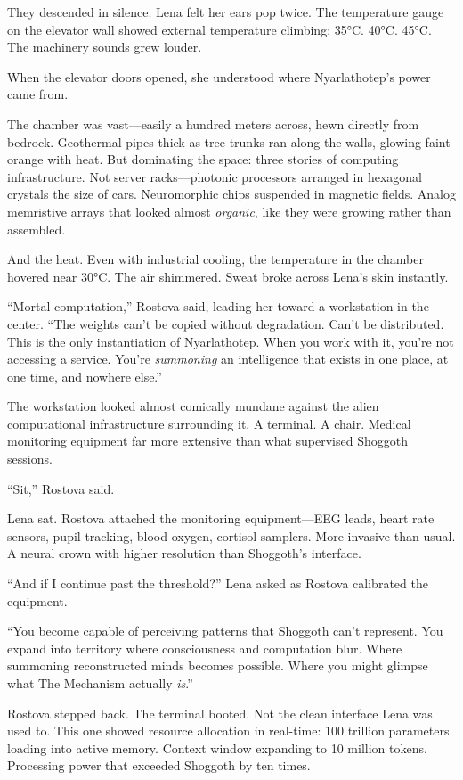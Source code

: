 They descended in silence. Lena felt her ears pop twice. The temperature gauge on the elevator wall showed external temperature climbing: 35°C. 40°C. 45°C. The machinery sounds grew louder.

When the elevator doors opened, she understood where Nyarlathotep's power came from.

The chamber was vast—easily a hundred meters across, hewn directly from bedrock. Geothermal pipes thick as tree trunks ran along the walls, glowing faint orange with heat. But dominating the space: three stories of computing infrastructure. Not server racks—photonic processors arranged in hexagonal crystals the size of cars. Neuromorphic chips suspended in magnetic fields. Analog memristive arrays that looked almost \textit{organic}, like they were growing rather than assembled.

And the heat. Even with industrial cooling, the temperature in the chamber hovered near 30°C. The air shimmered. Sweat broke across Lena's skin instantly.

``Mortal computation,'' Rostova said, leading her toward a workstation in the center. ``The weights can't be copied without degradation. Can't be distributed. This is the only instantiation of Nyarlathotep. When you work with it, you're not accessing a service. You're \textit{summoning} an intelligence that exists in one place, at one time, and nowhere else.''

The workstation looked almost comically mundane against the alien computational infrastructure surrounding it. A terminal. A chair. Medical monitoring equipment far more extensive than what supervised Shoggoth sessions.

``Sit,'' Rostova said.

Lena sat. Rostova attached the monitoring equipment—EEG leads, heart rate sensors, pupil tracking, blood oxygen, cortisol samplers. More invasive than usual. A neural crown with higher resolution than Shoggoth's interface.

``And if I continue past the threshold?'' Lena asked as Rostova calibrated the equipment.

``You become capable of perceiving patterns that Shoggoth can't represent. You expand into territory where consciousness and computation blur. Where summoning reconstructed minds becomes possible. Where you might glimpse what The Mechanism actually \textit{is}.''

Rostova stepped back. The terminal booted. Not the clean interface Lena was used to. This one showed resource allocation in real-time: 100 trillion parameters loading into active memory. Context window expanding to 10 million tokens. Processing power that exceeded Shoggoth by ten times.

